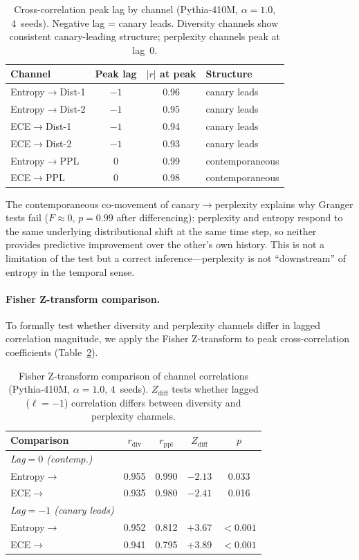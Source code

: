 \begin{table}[t]
\centering
\small
\caption{Cross-correlation peak lag by channel (Pythia-410M, $\alpha{=}1.0$, 4~seeds). Negative lag = canary leads. Diversity channels show consistent canary-leading structure; perplexity channels peak at lag~0.}
\label{tab:lag_structure}
\begin{tabular}{lccl}
\toprule
Channel & Peak lag & $|r|$ at peak & Structure \\
\midrule
Entropy$\to$Dist-1 & $-1$ & 0.96 & canary leads \\
Entropy$\to$Dist-2 & $-1$ & 0.95 & canary leads \\
ECE$\to$Dist-1 & $-1$ & 0.94 & canary leads \\
ECE$\to$Dist-2 & $-1$ & 0.93 & canary leads \\
Entropy$\to$PPL & $0$ & 0.99 & contemporaneous \\
ECE$\to$PPL & $0$ & 0.98 & contemporaneous \\
\bottomrule
\end{tabular}
\end{table}

The contemporaneous co-movement of canary$\to$perplexity explains why Granger tests fail ($F{\approx}0$, $p{=}0.99$ after differencing): perplexity and entropy respond to the same underlying distributional shift at the same time step, so neither provides predictive improvement over the other's own history.
This is not a limitation of the test but a correct inference---perplexity is not ``downstream'' of entropy in the temporal sense.

\paragraph{Fisher Z-transform comparison.}
To formally test whether diversity and perplexity channels differ in lagged correlation magnitude, we apply the Fisher Z-transform to peak cross-correlation coefficients (Table~\ref{tab:fisher_z}).

\begin{table}[t]
\centering
\small
\caption{Fisher Z-transform comparison of channel correlations (Pythia-410M, $\alpha{=}1.0$, 4~seeds). $Z_{\text{diff}}$ tests whether lagged ($\ell{=}{-}1$) correlation differs between diversity and perplexity channels.}
\label{tab:fisher_z}
\begin{tabular}{lcccc}
\toprule
Comparison & $r_{\text{div}}$ & $r_{\text{ppl}}$ & $Z_{\text{diff}}$ & $p$ \\
\midrule
\emph{Lag${=}0$ (contemp.)} \\
\quad Entropy$\to$ & 0.955 & 0.990 & $-2.13$ & 0.033 \\
\quad ECE$\to$ & 0.935 & 0.980 & $-2.41$ & 0.016 \\
\midrule
\emph{Lag${=}{-}1$ (canary leads)} \\
\quad Entropy$\to$ & 0.952 & 0.812 & $+3.67$ & ${<}0.001$ \\
\quad ECE$\to$ & 0.941 & 0.795 & $+3.89$ & ${<}0.001$ \\
\bottomrule
\end{tabular}
\end{table}

